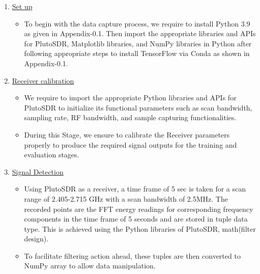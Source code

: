 \begin{enumerate}
  \item \underline{Set up}
    \begin{itemize}
      \item To begin with the data capture process, we require to install Python 3.9 as given in Appendix-0.1. Then import the appropriate libraries and APIs for PlutoSDR, Matplotlib libraries, and NumPy libraries in Python after following appropriate steps to install TensorFlow via Conda as shown in Appendix-0.1.
    \end{itemize}

  \item \underline{ Receiver calibration}
    \begin{itemize}
      \item We require to import the appropriate Python libraries and APIs for PlutoSDR to initialize its functional parameters such as scan bandwidth, sampling rate, RF bandwidth, and sample capturing functionalities.
      \item During this Stage, we ensure to calibrate the Receiver parameters properly to produce the required signal outputs for the training and evaluation stages.
    \end{itemize}


  \item \underline{ Signal Detection}
    \begin{itemize}
      \item Using PlutoSDR as a receiver, a time frame of 5 sec is taken for a  scan range of 2.405-2.715 GHz with a scan bandwidth of 2.5MHz. The recorded points are the FFT energy readings for corresponding frequency components in the time frame of 5 seconds and are stored in tuple data type. This is achieved using the Python libraries of PlutoSDR, math(filter design).
      \item To facilitate filtering action ahead, these tuples are then converted to NumPy array to allow data manipulation.
    \end{itemize}
\end{enumerate}


